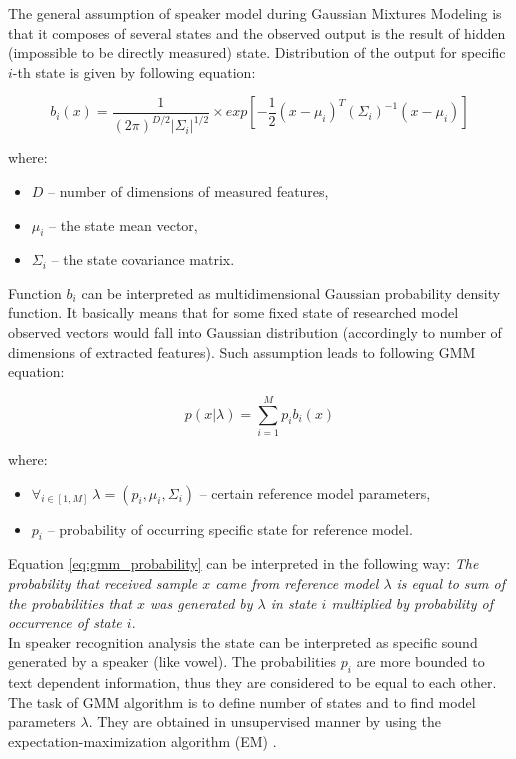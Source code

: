 \documentclass[magister]{dyplom}
\begin{document}
	The general assumption of speaker model during Gaussian Mixtures Modeling is that it composes of several states and the observed output is the result of hidden (impossible to be directly measured) state. Distribution of the output for specific $i$-th state is given by following equation:
	
	\begin{equation} \label{eq:gaussian_pdf}
		b_i(x) = \frac{1}{(2 \pi)^{D/2} |\Sigma_i|^{1/2}} \times exp \left[ - \frac{1}{2} (x - \mu_i)^T (\Sigma_i)^{-1} (x - \mu_i) \right]
	\end{equation}
	
	where:
	
	\begin{itemize}
		\item $D$ -- number of dimensions of measured features,
		\item $\mu_i$ -- the state mean vector,
		\item $\Sigma_i$ -- the state covariance matrix.
	\end{itemize}
	
	Function $b_i$ can be interpreted as multidimensional Gaussian probability density function. It basically means that for some fixed state of researched model observed vectors would fall into Gaussian distribution (accordingly to number of dimensions of extracted features). Such assumption leads to following \gls{GMM} equation:
	
	\begin{equation} \label{eq:gmm_probability}
		p(x|\lambda) = \sum_{i=1}^{M} p_i b_i(x)
	\end{equation}
	
	where:
	
	\begin{itemize}
		\item $\forall_{i \in [1, M]} \ \lambda = (p_i, \mu_i, \Sigma_i)$ -- certain reference model parameters,
		\item $p_i$ -- probability of occurring specific state for reference model.
	\end{itemize}
	
	Equation \ref{eq:gmm_probability} can be interpreted in the following way: \emph{The probability that received sample $x$ came from reference model $\lambda$ is equal to sum of the probabilities that $x$ was generated by $\lambda$ in state $i$ multiplied by probability of occurrence of state $i$}. \\
	
	In speaker recognition analysis the state can be interpreted as specific sound generated by a speaker (like vowel). The probabilities $p_i$ are more bounded to text dependent information, thus they are considered to be equal to each other. The task of \gls{GMM} algorithm is to define number of states and to find model parameters $\lambda$. They are obtained in unsupervised manner by using the expectation-maximization algorithm (EM) \cite{GaussianMixtures}.
	
\end{document}
